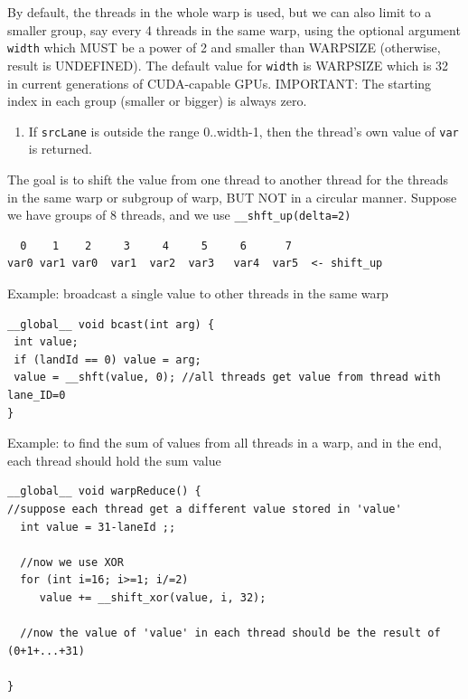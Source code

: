 By default, the threads in the whole warp is used, but we can also limit to a
smaller group, say every 4 threads in the same warp, using the optional argument
\verb!width! which MUST be a power of 2 and smaller than WARPSIZE (otherwise,
result is UNDEFINED). The default value for \verb!width! is WARPSIZE which is 32
in current generations of CUDA-capable GPUs. IMPORTANT: The starting index in
each group (smaller or bigger) is always zero.
\begin{enumerate}
  \item If \verb!srcLane! is outside the range 0..width-1, then the thread's own
  value of \verb!var! is returned.
\end{enumerate}

The goal is to shift the value from one thread to another thread for the threads
in the same warp or subgroup of warp, BUT NOT in a circular manner. Suppose we
have groups of 8 threads, and we use \verb!__shft_up(delta=2)!
\begin{verbatim}
  0    1    2     3     4     5     6      7  
var0 var1 var0  var1  var2  var3   var4  var5  <- shift_up
\end{verbatim}

Example: broadcast a single value to other threads in the same warp
\begin{verbatim}
__global__ void bcast(int arg) {
 int value;
 if (landId == 0) value = arg;
 value = __shft(value, 0); //all threads get value from thread with lane_ID=0
}
\end{verbatim}
 
Example: to find the sum of values from all threads in a warp, and in the end,
each thread should hold the sum value
\begin{verbatim}
__global__ void warpReduce() {
//suppose each thread get a different value stored in 'value'
  int value = 31-laneId ;; 
  
  //now we use XOR
  for (int i=16; i>=1; i/=2)
     value += __shift_xor(value, i, 32);
     
  //now the value of 'value' in each thread should be the result of (0+1+...+31) 
  
}
\end{verbatim} 

